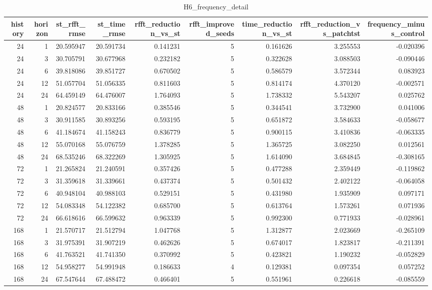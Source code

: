 \begin{table}
\caption{H6_frequency_detail}
\label{tab:H6_frequency_detail}
\begin{tabular}{rrrrrrrrr}
\toprule
history & horizon & st\_rfft\_rmse & st\_time\_rmse & rfft\_reduction\_vs\_st & rfft\_improved\_seeds & time\_reduction\_vs\_st & rfft\_reduction\_vs\_patchtst & frequency\_minus\_control \\
\midrule
24 & 1 & 20.595947 & 20.591734 & 0.141231 & 5 & 0.161626 & 3.255553 & -0.020396 \\
24 & 3 & 30.705791 & 30.677968 & 0.232182 & 5 & 0.322628 & 3.088503 & -0.090446 \\
24 & 6 & 39.818086 & 39.851727 & 0.670502 & 5 & 0.586579 & 3.572344 & 0.083923 \\
24 & 12 & 51.057704 & 51.056335 & 0.811603 & 5 & 0.814174 & 4.370120 & -0.002571 \\
24 & 24 & 64.459149 & 64.476007 & 1.764093 & 5 & 1.738332 & 5.543207 & 0.025762 \\
48 & 1 & 20.824577 & 20.833166 & 0.385546 & 5 & 0.344541 & 3.732900 & 0.041006 \\
48 & 3 & 30.911585 & 30.893256 & 0.593195 & 5 & 0.651872 & 3.584633 & -0.058677 \\
48 & 6 & 41.184674 & 41.158243 & 0.836779 & 5 & 0.900115 & 3.410836 & -0.063335 \\
48 & 12 & 55.070168 & 55.076759 & 1.378285 & 5 & 1.365725 & 3.082250 & 0.012561 \\
48 & 24 & 68.535246 & 68.322269 & 1.305925 & 5 & 1.614090 & 3.684845 & -0.308165 \\
72 & 1 & 21.265824 & 21.240591 & 0.357426 & 5 & 0.477288 & 2.359449 & -0.119862 \\
72 & 3 & 31.359618 & 31.339661 & 0.437374 & 5 & 0.501432 & 2.402122 & -0.064058 \\
72 & 6 & 40.948104 & 40.988103 & 0.529151 & 5 & 0.431980 & 1.935909 & 0.097171 \\
72 & 12 & 54.083348 & 54.122382 & 0.685700 & 5 & 0.613764 & 1.573261 & 0.071936 \\
72 & 24 & 66.618616 & 66.599632 & 0.963339 & 5 & 0.992300 & 0.771933 & -0.028961 \\
168 & 1 & 21.570717 & 21.512794 & 1.047768 & 5 & 1.312877 & 2.023669 & -0.265109 \\
168 & 3 & 31.975391 & 31.907219 & 0.462626 & 5 & 0.674017 & 1.823817 & -0.211391 \\
168 & 6 & 41.763521 & 41.741350 & 0.370992 & 5 & 0.423821 & 1.190232 & -0.052829 \\
168 & 12 & 54.958277 & 54.991948 & 0.186633 & 4 & 0.129381 & 0.097354 & 0.057252 \\
168 & 24 & 67.547644 & 67.488472 & 0.466401 & 5 & 0.551961 & 0.226618 & -0.085559 \\
\bottomrule
\end{tabular}
\end{table}
